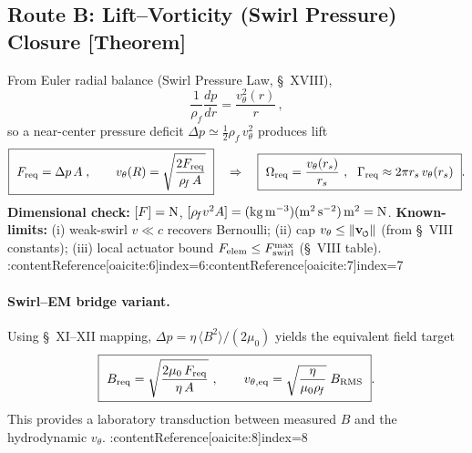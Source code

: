\documentclass[10pt,reprint,aps,onecolumn,nofootinbib]{revtex4-2}
\newcommand{\vnorm}{\lVert \mathbf{v}_{\mkern-2mu\scriptscriptstyle\boldsymbol{\circlearrowleft}} \rVert}               %
\newcommand{\rhoF}{\rho_{\!f}}     %
\begin{document}
    \subsection{Route B: Lift--Vorticity (Swirl Pressure) Closure [Theorem]}
        \label{subsec:LiftRoute}
        From Euler radial balance (Swirl Pressure Law, \S~XVIII),
        \[
            \frac{1}{\rhoF}\frac{d p}{dr}=\frac{v_\theta^2(r)}{r}\,,
        \]
        so a near-center pressure deficit $\Delta p \simeq \tfrac{1}{2}\rhoF\,v_\theta^2$ produces lift
        \begin{equation}
            \boxed{\ F_{\rm req}=\Delta p\,A\;,\qquad v_\theta(R)=\sqrt{\frac{2F_{\rm req}}{\rhoF\,A}}\ }\quad\Rightarrow\quad
            \boxed{\ \Omega_{\rm req}=\frac{v_\theta(r_s)}{r_s}\ ,\ \ \Gamma_{\rm req}\approx 2\pi r_s\,v_\theta(r_s)\ }.
        \end{equation}
        \textbf{Dimensional check:} $[F]=\rm N$, $[\rhoF v^2 A]=\rm (kg\,m^{-3})(m^2\,s^{-2})\,m^2=N$.
        \textbf{Known-limits:} (i) weak-swirl $v\!\ll\!c$ recovers Bernoulli; (ii) cap $v_\theta\le \vnorm$ (from \S~VIII constants); (iii) local actuator bound $F_{\rm elem}\le F_{\text{swirl}}^{\max}$ (\S~VIII table). :contentReference[oaicite:6]{index=6}:contentReference[oaicite:7]{index=7}

        \paragraph{Swirl--EM bridge variant.}
            Using \S~XI--XII mapping, $\Delta p=\eta\,\langle B^2\rangle/(2\mu_0)$ yields the equivalent field target
            \begin{equation}
                \boxed{\ B_{\rm req}=\sqrt{\frac{2\mu_0\,F_{\rm req}}{\eta\,A}}\ ,\qquad
                v_{\theta,{\rm eq}}=\sqrt{\frac{\eta}{\mu_0\rhoF}}\;B_{\rm RMS}\ }.
            \end{equation}
            This provides a laboratory transduction between measured $B$ and the hydrodynamic $v_\theta$. :contentReference[oaicite:8]{index=8}
\end{document}
